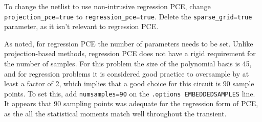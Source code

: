 To change the netlist to use non-intrusive regression PCE, change \texttt{projection\_pce=true} 
to \texttt{regression\_pce=true}.  Delete the \texttt{sparse\_grid=true} parameter, as 
it isn't relevant to regression PCE.  

As noted, for regression PCE the number of parameters needs to be set.  Unlike projection-based methods, 
regression PCE does not have a rigid requirement for the number of samples.  For this 
problem the size of the polynomial basis is 45, and for regression problems it 
is considered good practice to oversample by at least a factor of 2, which implies that
a good choice for this circuit is 90 sample points.   
To set this, add \texttt{numsamples=90} on the \texttt{.options EMBEDDEDSAMPLES} line.  
It appears that 90 sampling points was 
adequate for the regression form of PCE, as the all the statistical moments 
match well throughout the transient.

